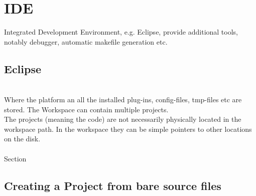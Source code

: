 \chapter{IDE}
Integrated Development Environment, e.g. Eclipse, provide additional tools, notably debugger, automatic makefile generation etc.
\section{Eclipse}
\\
Where the platform an all the installed plug-ins, config-files, tmp-files etc are stored. The Workspace can contain multiple projects.\\
The projects (meaning the  code) are not necessarily physically located in the workspace path. In the workspace they can be simple pointers to other locations on the disk.
\ \\
\\
Section


\section{Creating a Project from bare source files}